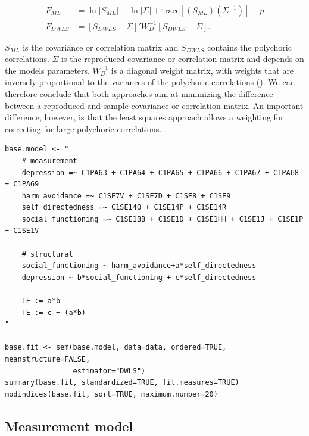 \documentclass[11pt]{article}
\begin{document}
\begin{align}
  F_{ML} &= \ln |S_{ML}| - \ln |\Sigma| + \text{trace}[(S_{ML})(\Sigma^{-1})] - p \tag{ML fit function} \\
  F_{DWLS} &= [S_{DWLS}-\Sigma]' W^{-1}_D [S_{DWLS}-\Sigma].                      \tag{DWLS fit function}
\end{align}

$S_{ML}$ is the covariance or correlation matrix and $S_{DWLS}$ contains the
polychoric correlations. $\Sigma$ is the reproduced covariance or correlation
matrix and depends on the models parameters. $W_D^{-1}$ is a diagonal weight
matrix, with weights that are inversely proportional to the variances of the
polychoric correlations (\cite{yangwallentin2010}). We can therefore conclude that
both approaches aim at minimizing the difference between a reproduced and sample
covariance or correlation matrix. An important difference, however, is that the
least squares approach allows a weighting for correcting for large polychoric
correlations.

\begin{minipage}{\linewidth}
\begin{lstlisting}
base.model <- "
    # measurement
    depression =~ C1PA63 + C1PA64 + C1PA65 + C1PA66 + C1PA67 + C1PA68 + C1PA69
    harm_avoidance =~ C1SE7V + C1SE7D + C1SE8 + C1SE9
    self_directedness =~ C1SE14O + C1SE14P + C1SE14R
    social_functioning =~ C1SE1BB + C1SE1D + C1SE1HH + C1SE1J + C1SE1P + C1SE1V

    # structural
    social_functioning ~ harm_avoidance+a*self_directedness
    depression ~ b*social_functioning + c*self_directedness
    
    IE := a*b
    TE := c + (a*b) 
"

base.fit <- sem(base.model, data=data, ordered=TRUE, meanstructure=FALSE,
                estimator="DWLS")
summary(base.fit, standardized=TRUE, fit.measures=TRUE)
modindices(base.fit, sort=TRUE, maximum.number=20)
\end{lstlisting}
\end{minipage}

\FloatBarrier
\subsection{Measurement model}
\end{document}

